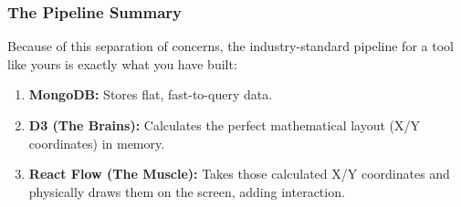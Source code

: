 \documentclass[12pt, a4paper]{article}
\begin{document}
\begin{answerbox}[Answer]
\subsubsection*{The Pipeline Summary}
Because of this separation of concerns, the industry-standard pipeline for a tool like yours is exactly what you have built:
\begin{enumerate}
    \item \textbf{MongoDB:} Stores flat, fast-to-query data.
    \item \textbf{D3 (The Brains):} Calculates the perfect mathematical layout (X/Y coordinates) in memory.
    \item \textbf{React Flow (The Muscle):} Takes those calculated X/Y coordinates and physically draws them on the screen, adding interaction.
\end{enumerate}
\end{answerbox}
\end{document}
